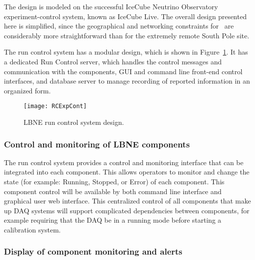 The design is modeled on the successful IceCube Neutrino Observatory
experiment-control system, known as IceCube
Live\cite{comp:icecube-live}.  The overall design presented here is
simplified, since the geographical and networking constraints for
\LBNE\ are considerably more straightforward than for the extremely
remote South Pole site.


The run control system has a modular design, which is shown in
Figure~\ref{fig:expcont}.  It has a dedicated Run Control server,
which handles the control messages and communication with the
components, GUI and command line front-end control interfaces, and
database server to manage recording of reported information in an
organized form.

\begin{figure}[htb]
  \centering
  \begin{center}
    \texttt{[image: RCExpCont]}
  \end{center}
    \caption[Run control system]{LBNE run control system design.}
  \label{fig:expcont}
\end{figure}

\subsubsection{Control and monitoring of LBNE components}

The run control system provides a control and monitoring
interface that can be integrated into each component.  This allows
operators to monitor and change the state (for example: Running,
Stopped, or Error) of each component.  This component control will be
available by both command line interface and graphical user web
interface.  This centralized control of all components that make up
DAQ systems will support complicated dependencies between components,
for example requiring that the DAQ be in a running mode before
starting a calibration system.

\subsubsection{Display of component monitoring and alerts}

